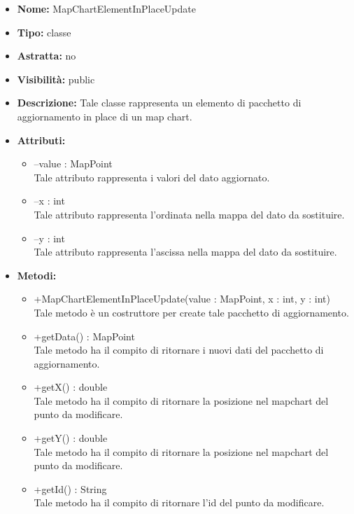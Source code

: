 			
			\begin{itemize}
			\item \textbf{Nome:} MapChartElementInPlaceUpdate
			\item \textbf{Tipo:} classe
			
		\item \textbf{Astratta:}
		no
			\item \textbf{Visibilità:} public
			\item \textbf{Descrizione:} Tale classe rappresenta un elemento di pacchetto di aggiornamento in place di un map chart.
			\item \textbf{Attributi:}
				\begin{itemize}
				\setlength{\itemsep}{5pt}
				
					\item[\ding{111}] {--value : MapPoint} \\ [1mm] Tale attributo rappresenta i valori del dato aggiornato.
					\item[\ding{111}] {--x : int} \\ [1mm] Tale attributo rappresenta l'ordinata nella mappa del dato da sostituire.
					\item[\ding{111}] {--y : int} \\ [1mm] Tale attributo rappresenta l'ascissa nella mappa del dato da sostituire.
				\end{itemize}
		
			\item \textbf{Metodi:}
				\begin{itemize}
				\setlength{\itemsep}{5pt}
				
					\item[\ding{111}] {{+MapChartElementInPlaceUpdate(value : MapPoint, x : int, y : int)}} \\ [1mm] Tale metodo è un costruttore per create tale pacchetto di aggiornamento.
					\item[\ding{111}] {{+getData() : MapPoint}} \\ [1mm] Tale metodo ha il compito di ritornare i nuovi dati del pacchetto di aggiornamento.
					\item[\ding{111}] {{+getX() : double}} \\ [1mm] Tale metodo ha il compito di ritornare la posizione nel mapchart del punto da modificare.
					\item[\ding{111}] {{+getY() : double}} \\ [1mm] Tale metodo ha il compito di ritornare la posizione nel mapchart del punto da modificare.
					\item[\ding{111}] {{+getId() : String}} \\ [1mm] Tale metodo ha il compito di ritornare l'id del punto da modificare.
				\end{itemize}
		
			\end{itemize}
	
